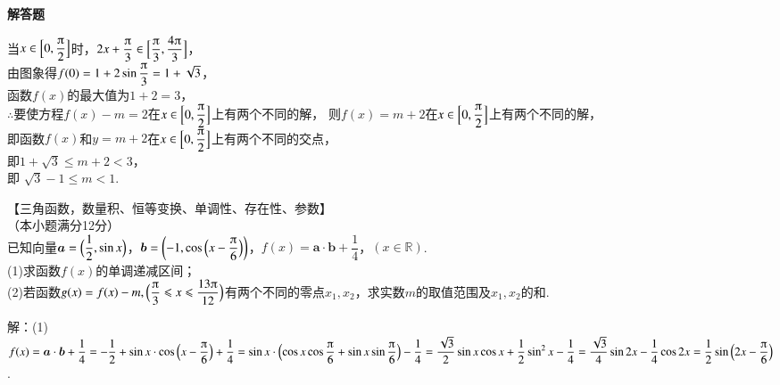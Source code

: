 \begin{exercise}{\bf 解答题}
\begin{answer}
        当${x\in\Bigl[0,\dfrac{\piup}2\Bigr]}$时，$2x+\dfrac{\piup}3\in\Bigl[\dfrac{\piup}3,\dfrac{4\piup}3\Bigr]$，\\
        由图象得$f(0)=1+2\sin{\dfrac{\piup}3}=1+\sqrt3$，\\
        函数$f(x)$的最大值为$1+2=3$，\\
        $\therefore$要使方程$f(x)-m=2$在$x\in\Bigl[0,\dfrac{\piup}2\Bigr]$上有两个不同的解，
        则$f(x)=m+2$在$x\in\Bigl[0,\dfrac{\piup}2\Bigr]$上有两个不同的解，\\
        即函数$f(x)$和$y=m+2$在$x\in\Bigl[0,\dfrac{\piup}2\Bigr]$上有两个不同的交点，\\
        即$1+\sqrt3\leqslant m+2<3$，\\
        即 $\sqrt3-1\leqslant m<1$.
      \end{answer}
    \item 【三角函数，数量积、恒等变换、单调性、存在性、参数】\\
      （本小题满分12分）\\
      已知向量$\bm a=\Bigl(\dfrac{1}2,\sin x\Bigr)$，$\bm b=\biggl(-1,\cos{\Bigl(x-\dfrac{\piup}6\Bigr)}\biggr)$，$f(x)=\bm a\cdot\bm b+\dfrac{1}4$，$(x\in\mathbb{R})$.\\
      (1)求函数$f(x)$的单调递减区间；\\
      (2)若函数$g(x)=f(x)-m,\Bigl(\dfrac{\piup}3\leqslant x\leqslant\dfrac{13\piup}{12}\Bigr)$有两个不同的零点$x_1,x_2$，求实数$m$的取值范围及$x_1,x_2$的和.
      \begin{answer}
        解：(1)$f(x)=\bm a\cdot\bm b+\dfrac{1}4
        =-\dfrac12+\sin{x}\cdot\cos{\Bigl(x-\dfrac{\piup}6\Bigr)}+\dfrac14
        =\sin{x}\cdot \Bigl(\cos x\cos{\dfrac{\piup}6}+\sin x\sin{\dfrac{\piup}6}\Bigr)-\dfrac14
        =\dfrac{\sqrt3}2\sin x\cos x+\dfrac12\sin^2x-\dfrac14
        =\dfrac{\sqrt3}4\sin{2x}-\dfrac14\cos{2x}
        =\dfrac12\sin{\Bigl(2x-\dfrac{\piup}6\Bigr)}$.\\

\end{answer}
\end{exercise}
